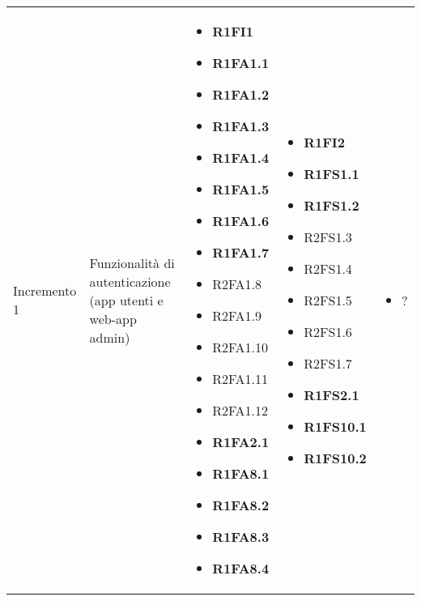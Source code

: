 {\begin{longtable}{C{2.5cm} C{3.2cm} C{2.8cm} C{2.8cm} C{2.8cm}}
Incremento 1 & Funzionalità di autenticazione (app utenti e web-app admin) & \begin{itemize}
    \item[ ] \textbf{R1FI1}
    \item[ ] \textbf{R1FA1.1}
    \item[ ] \textbf{R1FA1.2}
    \item[ ] \textbf{R1FA1.3}
    \item[ ] \textbf{R1FA1.4}
    \item[ ] \textbf{R1FA1.5}
    \item[ ] \textbf{R1FA1.6}
    \item[ ] \textbf{R1FA1.7}
    \item[ ] R2FA1.8
    \item[ ] R2FA1.9
    \item[ ] R2FA1.10
    \item[ ] R2FA1.11
    \item[ ] R2FA1.12 
    \item[ ] \textbf{R1FA2.1}
    \item[ ] \textbf{R1FA8.1}
    \item[ ] \textbf{R1FA8.2}
    \item[ ] \textbf{R1FA8.3}
    \item[ ] \textbf{R1FA8.4}
\end{itemize} & \begin{itemize} 
    \item[ ] \textbf{R1FI2}
    \item[ ] \textbf{R1FS1.1}
    \item[ ] \textbf{R1FS1.2}
    \item[ ] R2FS1.3
    \item[ ] R2FS1.4
    \item[ ] R2FS1.5
    \item[ ] R2FS1.6
    \item[ ] R2FS1.7
    \item[ ] \textbf{R1FS2.1}
    \item[ ] \textbf{R1FS10.1}
    \item[ ] \textbf{R1FS10.2}
\end{itemize} & \begin{itemize} 
    \item[ ] ?
\end{itemize}\\


\end{longtable}}
